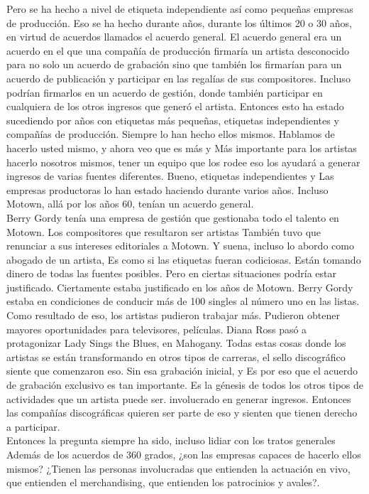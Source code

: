 \documentclass[10pt]{book}
\begin{document}
Pero se ha hecho a nivel de etiqueta independiente así como pequeñas empresas de producción. Eso se ha hecho durante años, durante los últimos 20 o 30 años, en virtud de acuerdos llamados el acuerdo general. El acuerdo general era un acuerdo en el que una compañía de producción firmaría un artista desconocido para no solo un acuerdo de grabación sino que también los firmarían para un acuerdo de publicación y participar en las regalías de sus compositores. Incluso podrían firmarlos en un acuerdo de gestión, donde también participar en cualquiera de los otros ingresos que generó el artista. Entonces esto ha estado sucediendo por años con etiquetas más pequeñas, etiquetas independientes y compañías de producción. Siempre lo han hecho ellos mismos. Hablamos de hacerlo usted mismo, y ahora veo que es más y Más importante para los artistas hacerlo nosotros mismos, tener un equipo que los rodee eso los ayudará a generar ingresos de varias fuentes diferentes. Bueno, etiquetas independientes y Las empresas productoras lo han estado haciendo durante varios años. Incluso Motown, allá por los años 60, tenían un acuerdo general.\\
Berry Gordy tenía una empresa de gestión que gestionaba todo el talento en Motown. Los compositores que resultaron ser artistas También tuvo que renunciar a sus intereses editoriales a Motown. Y suena, incluso lo abordo como abogado de un artista, Es como si las etiquetas fueran codiciosas. Están tomando dinero de todas las fuentes posibles. Pero en ciertas situaciones podría estar justificado. Ciertamente estaba justificado en los años de Motown. Berry Gordy estaba en condiciones de conducir más de 100 singles al número uno en las listas. Como resultado de eso, los artistas pudieron trabajar más. Pudieron obtener mayores oportunidades para televisores, películas. Diana Ross pasó a protagonizar Lady Sings the Blues, en Mahogany. Todas estas cosas donde los artistas se están transformando en otros tipos de carreras, el sello discográfico siente que comenzaron eso. Sin esa grabación inicial, y Es por eso que el acuerdo de grabación exclusivo es tan importante. Es la génesis de todos los otros tipos de actividades que un artista puede ser. involucrado en generar ingresos. Entonces las compañías discográficas quieren ser parte de eso y sienten que tienen derecho a participar.\\
Entonces la pregunta siempre ha sido, incluso lidiar con los tratos generales Además de los acuerdos de 360 grados, ¿son las empresas capaces de hacerlo ellos mismos? ¿Tienen las personas involucradas que entienden la actuación en vivo, que entienden el merchandising, que entienden los patrocinios y avales?.\\
\end{document}

